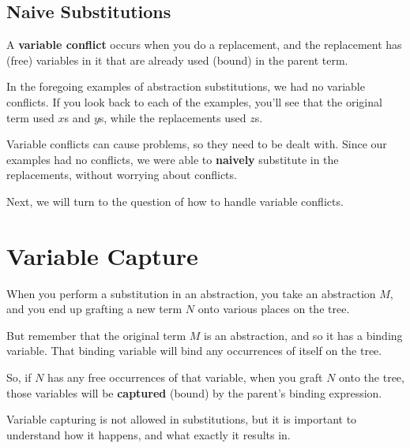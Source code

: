 \documentclass{book}
\numberwithin{equation}{chapter}
\newcommand{\vocab}{\textbf}
\begin{document}
\section{Naive Substitutions}

A \vocab{variable conflict} occurs when you do a replacement, and the replacement has (free) variables in it that are already used (bound) in the parent term. 

In the foregoing examples of abstraction substitutions, we had no variable conflicts. If you look back to each of the examples, you'll see that the original term used $x$s and $y$s, while the replacements used $z$s.

Variable conflicts can cause problems, so they need to be dealt with. Since our examples had no conflicts, we were able to \vocab{naively} substitute in the replacements, without worrying about conflicts.

Next, we will turn to the question of how to handle variable conflicts.


\chapter{Variable Capture}

When you perform a substitution in an abstraction, you take an abstraction $M$, and you end up grafting a new term $N$ onto various places on the tree.

But remember that the original term $M$ is an abstraction, and so it has a binding variable. That binding variable will bind any occurrences of itself on the tree. 

So, if $N$ has any free occurrences of that variable, when you graft $N$ onto the tree, those variables will be \vocab{captured} (bound) by the parent's binding expression. 

Variable capturing is not allowed in substitutions, but it is important to understand how it happens, and what exactly it results in.


\end{document}
